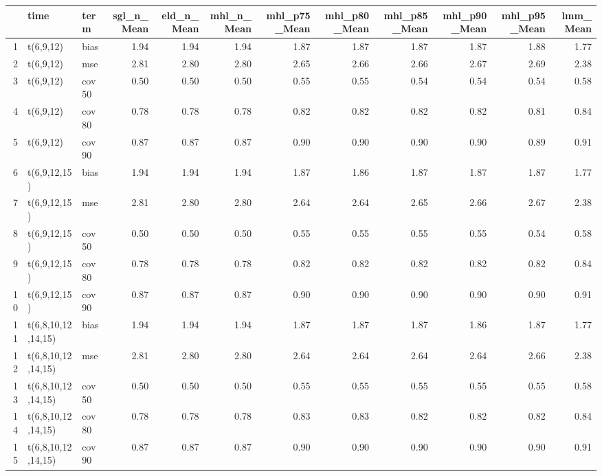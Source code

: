 \begin{table}[ht]
\centering
\begin{tabular}{rllrrrrrrrrr}
  \hline
 & time & term & sgl\_n\_Mean & eld\_n\_Mean & mhl\_n\_Mean & mhl\_p75\_Mean & mhl\_p80\_Mean & mhl\_p85\_Mean & mhl\_p90\_Mean & mhl\_p95\_Mean & lmm\_Mean \\ 
  \hline
1 & t(6,9,12) & bias & 1.94 & 1.94 & 1.94 & 1.87 & 1.87 & 1.87 & 1.87 & 1.88 & 1.77 \\ 
  2 & t(6,9,12) & mse & 2.81 & 2.80 & 2.80 & 2.65 & 2.66 & 2.66 & 2.67 & 2.69 & 2.38 \\ 
  3 & t(6,9,12) & cov50 & 0.50 & 0.50 & 0.50 & 0.55 & 0.55 & 0.54 & 0.54 & 0.54 & 0.58 \\ 
  4 & t(6,9,12) & cov80 & 0.78 & 0.78 & 0.78 & 0.82 & 0.82 & 0.82 & 0.82 & 0.81 & 0.84 \\ 
  5 & t(6,9,12) & cov90 & 0.87 & 0.87 & 0.87 & 0.90 & 0.90 & 0.90 & 0.90 & 0.89 & 0.91 \\ 
  6 & t(6,9,12,15) & bias & 1.94 & 1.94 & 1.94 & 1.87 & 1.86 & 1.87 & 1.87 & 1.87 & 1.77 \\ 
  7 & t(6,9,12,15) & mse & 2.81 & 2.80 & 2.80 & 2.64 & 2.64 & 2.65 & 2.66 & 2.67 & 2.38 \\ 
  8 & t(6,9,12,15) & cov50 & 0.50 & 0.50 & 0.50 & 0.55 & 0.55 & 0.55 & 0.55 & 0.54 & 0.58 \\ 
  9 & t(6,9,12,15) & cov80 & 0.78 & 0.78 & 0.78 & 0.82 & 0.82 & 0.82 & 0.82 & 0.82 & 0.84 \\ 
  10 & t(6,9,12,15) & cov90 & 0.87 & 0.87 & 0.87 & 0.90 & 0.90 & 0.90 & 0.90 & 0.90 & 0.91 \\ 
  11 & t(6,8,10,12,14,15) & bias & 1.94 & 1.94 & 1.94 & 1.87 & 1.87 & 1.87 & 1.86 & 1.87 & 1.77 \\ 
  12 & t(6,8,10,12,14,15) & mse & 2.81 & 2.80 & 2.80 & 2.64 & 2.64 & 2.64 & 2.64 & 2.66 & 2.38 \\ 
  13 & t(6,8,10,12,14,15) & cov50 & 0.50 & 0.50 & 0.50 & 0.55 & 0.55 & 0.55 & 0.55 & 0.55 & 0.58 \\ 
  14 & t(6,8,10,12,14,15) & cov80 & 0.78 & 0.78 & 0.78 & 0.83 & 0.83 & 0.82 & 0.82 & 0.82 & 0.84 \\ 
  15 & t(6,8,10,12,14,15) & cov90 & 0.87 & 0.87 & 0.87 & 0.90 & 0.90 & 0.90 & 0.90 & 0.90 & 0.91 \\ 
   \hline
\end{tabular}
\end{table}
